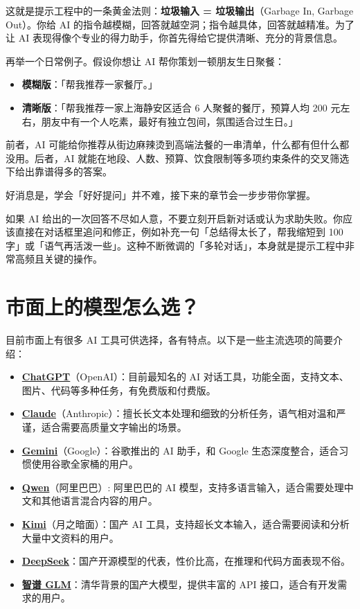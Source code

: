 这就是提示工程中的一条黄金法则：\textbf{垃圾输入 = 垃圾输出}（Garbage In, Garbage Out）。你给 AI 的指令越模糊，回答就越空洞；指令越具体，回答就越精准。为了让 AI 表现得像个专业的得力助手，你首先得给它提供清晰、充分的背景信息。

再举一个日常例子。假设你想让 AI 帮你策划一顿朋友生日聚餐：

\begin{itemize}
  \item \textbf{模糊版}：「帮我推荐一家餐厅。」
  \item \textbf{清晰版}：「帮我推荐一家上海静安区适合 6 人聚餐的餐厅，预算人均 200 元左右，朋友中有一个人吃素，最好有独立包间，氛围适合过生日。」
\end{itemize}

前者，AI 可能给你推荐从街边麻辣烫到高端法餐的一串清单，什么都有但什么都没用。后者，AI 就能在地段、人数、预算、饮食限制等多项约束条件的交叉筛选下给出靠谱得多的答案。

好消息是，学会「好好提问」并不难，接下来的章节会一步步带你掌握。

\begin{tipbox}
如果 AI 给出的一次回答不尽如人意，不要立刻开启新对话或认为求助失败。你应该直接在对话框里追问和修正，例如补充一句「总结得太长了，帮我缩短到 100 字」或「语气再活泼一些」。这种不断微调的「多轮对话」，本身就是提示工程中非常高频且关键的操作。
\end{tipbox}

\section{市面上的模型怎么选？}

目前市面上有很多 AI 工具可供选择，各有特点。以下是一些主流选项的简要介绍：

\begin{itemize}
  \item \href{https://chatgpt.com}{\textbf{ChatGPT}}（OpenAI）：目前最知名的 AI 对话工具，功能全面，支持文本、图片、代码等多种任务，有免费版和付费版。
  \item \href{https://claude.ai}{\textbf{Claude}}（Anthropic）：擅长长文本处理和细致的分析任务，语气相对温和严谨，适合需要高质量文字输出的场景。
  \item \href{https://gemini.google.com}{\textbf{Gemini}}（Google）：谷歌推出的 AI 助手，和 Google 生态深度整合，适合习惯使用谷歌全家桶的用户。
  \item \href{https://qwen.ai}{\textbf{Qwen}}（阿里巴巴）: 阿里巴巴的 AI 模型，支持多语言输入，适合需要处理中文和其他语言混合内容的用户。
  \item \href{https://kimi.moonshot.cn}{\textbf{Kimi}}（月之暗面）：国产 AI 工具，支持超长文本输入，适合需要阅读和分析大量中文资料的用户。
  \item \href{https://www.deepseek.com}{\textbf{DeepSeek}}：国产开源模型的代表，性价比高，在推理和代码方面表现不俗。
  \item \href{https://www.zhipuai.cn}{\textbf{智谱 GLM}}：清华背景的国产大模型，提供丰富的 API 接口，适合有开发需求的用户。
\end{itemize}

